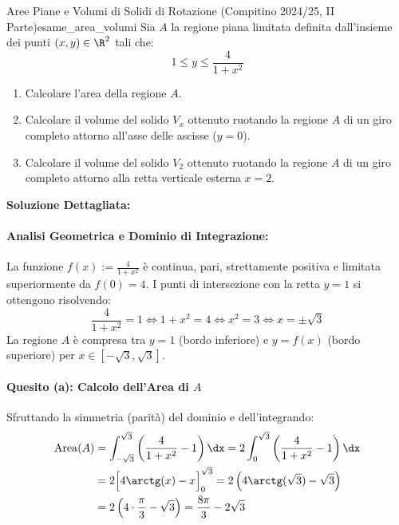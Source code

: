\begin{esempio}{Aree Piane e Volumi di Solidi di Rotazione (Compitino 2024/25, II Parte)}{esame_area_volumi}
Sia $A$ la regione piana limitata definita dall'insieme dei punti $(x, y) \in \R^2$ tali che:
\[
    1 \le y \le \frac{4}{1 + x^2}
\]
\begin{enumerate}[label=\alph*)]
    \item Calcolare l'area della regione $A$.
    \item Calcolare il volume del solido $V_x$ ottenuto ruotando la regione $A$ di un giro completo attorno all'asse delle ascisse ($y = 0$).
    \item Calcolare il volume del solido $V_2$ ottenuto ruotando la regione $A$ di un giro completo attorno alla retta verticale esterna $x = 2$.
\end{enumerate}
\tcblower
\textbf{Soluzione Dettagliata:}

\paragraph{Analisi Geometrica e Dominio di Integrazione:}
La funzione $f(x) := \frac{4}{1 + x^2}$ è continua, pari, strettamente positiva e limitata superiormente da $f(0) = 4$.
I punti di intersezione con la retta $y = 1$ si ottengono risolvendo:
\[
    \frac{4}{1 + x^2} = 1 \iff 1 + x^2 = 4 \iff x^2 = 3 \iff x = \pm\sqrt{3}
\]
La regione $A$ è compresa tra $y = 1$ (bordo inferiore) e $y = f(x)$ (bordo superiore) per $x \in [-\sqrt{3}, \sqrt{3}]$.

\paragraph{Quesito (a): Calcolo dell'Area di $A$}
Sfruttando la simmetria (parità) del dominio e dell'integrando:
\begin{align*}
    \operatorname{Area}(A) &= \int_{-\sqrt{3}}^{\sqrt{3}} \left(\frac{4}{1 + x^2} - 1\right) \dx = 2 \int_0^{\sqrt{3}} \left(\frac{4}{1 + x^2} - 1\right) \dx \\
    &= 2 \Big[ 4 \arctg(x) - x \Big]_0^{\sqrt{3}} = 2 \left( 4 \arctg(\sqrt{3}) - \sqrt{3} \right) \\
    &= 2 \left( 4 \cdot \frac{\pi}{3} - \sqrt{3} \right) = \frac{8\pi}{3} - 2\sqrt{3}
\end{align*}


\end{esempio}
